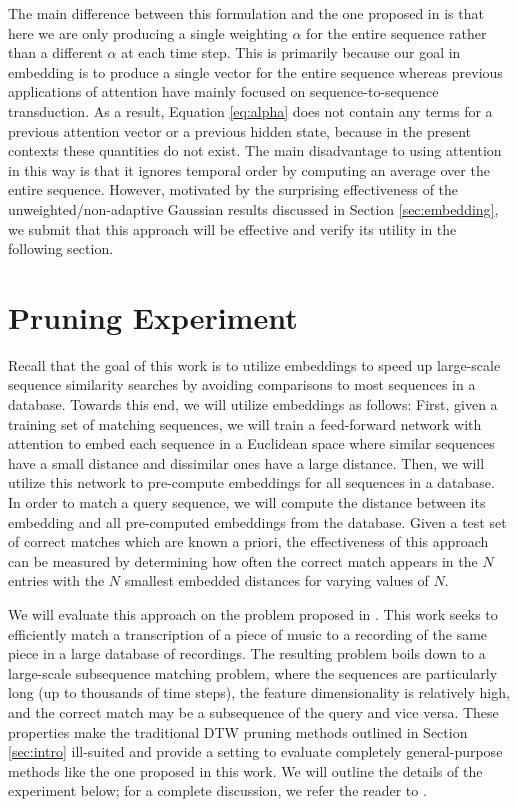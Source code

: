 \documentclass{article}
\begin{document}
The main difference between this formulation and the one proposed in \cite{bahdanau2014neural, cho2015describing} is that here we are only producing a single weighting $\alpha$ for the entire sequence rather than a different $\alpha$ at each time step.
This is primarily because our goal in embedding is to produce a single vector for the entire sequence whereas previous applications of attention have mainly focused on sequence-to-sequence transduction.
As a result, Equation \ref{eq:alpha} does not contain any terms for a previous attention vector or a previous hidden state, because in the present contexts these quantities do not exist.
The main disadvantage to using attention in this way is that it ignores temporal order by computing an average over the entire sequence.
However, motivated by the surprising effectiveness of the unweighted/non-adaptive Gaussian results discussed in Section \ref{sec:embedding}, we submit that this approach will be effective and verify its utility in the following section.

\section{Pruning Experiment}
\label{sec:experiment}

Recall that the goal of this work is to utilize embeddings to speed up large-scale sequence similarity searches by avoiding comparisons to most sequences in a database.
Towards this end, we will utilize embeddings as follows:
First, given a training set of matching sequences, we will train a feed-forward network with attention to embed each sequence in a Euclidean space where similar sequences have a small distance and dissimilar ones have a large distance.
Then, we will utilize this network to pre-compute embeddings for all sequences in a database.
In order to match a query sequence, we will compute the distance between its embedding and all pre-computed embeddings from the database.
Given a test set of correct matches which are known a priori, the effectiveness of this approach can be measured by determining how often the correct match appears in the $N$ entries with the $N$ smallest embedded distances for varying values of $N$.

We will evaluate this approach on the problem proposed in \cite{raffel2015large}.
This work seeks to efficiently match a transcription of a piece of music to a recording of the same piece in a large database of recordings.
The resulting problem boils down to a large-scale subsequence matching problem, where the sequences are particularly long (up to thousands of time steps), the feature dimensionality is relatively high, and the correct match may be a subsequence of the query and vice versa.
These properties make the traditional DTW pruning methods outlined in Section \ref{sec:intro} ill-suited and provide a setting to evaluate completely general-purpose methods like the one proposed in this work.
We will outline the details of the experiment below; for a complete discussion, we refer the reader to \cite{raffel2015large}.
\end{document}
